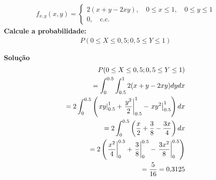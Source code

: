 \begin{description}
\begin{example}
    \begin{align*}
      f_{x,y} (x,y)= \begin{cases}
        2(x+y-2xy), \quad 0\leq x \leq 1, \quad 0 \leq y \leq 1\\
        0, \quad \text{c.c.}
      \end{cases}
    \end{align*}
    \textbf{Calcule a probabilidade:}
    \begin{align*}
      P(0 \leq X \leq 0,5; 0,5 \leq Y \leq 1)  
    \end{align*}
    
    \textbf{Solução}
    \begin{align*}
      P(0 \leq X \leq 0,5; 0,5 \leq Y \leq 1)  \\
      = \int_{0}^{0.5} \int_{0.5}^{1} 2(x+y -2xy)dy dx \\
      =2 \int_{0}^{0.5} \left( \left.xy\right\rvert_{0.5}^{1} + \left.\frac{y^2}{2}\right\rvert_{0.5}^{1} - \left.xy^2\right\rvert_{0.5}^{1} \right) dx \\
      = 2 \int_{0}^{0.5} \left( \frac{x}{2} + \frac{3}{8} - \frac{3x}{4} \right)dx \\
      = 2 \left( \left.\frac{x^2}{4}\right\rvert_{0}^{0.5} + \left.\frac{3}{8}\right\rvert_{0}^{0.5} -\left.\frac{3x^2}{8}\right\rvert_{0}^{0.5} \right) \\
      = \frac{5}{16}  =0{,}3125
      \end{align*}
  \end{example}
  \end{description}
